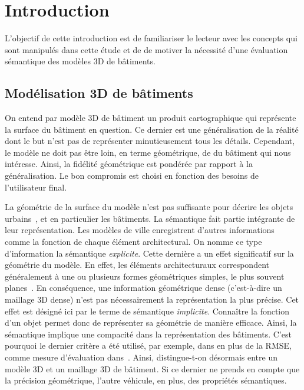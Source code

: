 \minitoc

\vfill

\section*{Introduction}

    L'objectif de cette introduction est de familiariser le lecteur avec les concepts qui sont manipulés dans cette étude et de de motiver la nécessité d'une évaluation sémantique des modèles 3D de bâtiments.\\

    \subsection*{Modélisation 3D de bâtiments}
        On entend par modèle 3D de bâtiment un produit cartographique qui représente la surface du bâtiment en question.
        Ce dernier est une généralisation de la réalité dont le but n'est pas de représenter minutieusement tous les détails.
        Cependant, le modèle ne doit pas être loin, en terme géométrique, de du bâtiment qui nous intéresse.
        Ainsi, la fidélité géométrique est pondérée par rapport à la généralisation.
        Le bon compromis est choisi en fonction des besoins de l'utilisateur final.

        La géométrie de la surface du modèle n'est pas suffisante pour décrire les objets urbains~\parencite{biljecki2016improved}, et en particulier les bâtiments.
        La sémantique fait partie intégrante de leur représentation.
        Les modèles de ville enregistrent d'autres informations comme la fonction de chaque élément architectural.
        On nomme ce type d'information la sémantique \textit{explicite}.
        Cette dernière a un effet significatif sur la géométrie du modèle.
        En effet, les éléments architecturaux correspondent généralement à une ou plusieurs formes géométriques simples, le plus souvent planes~\parencite{kolbe2005citygml}.
        En conséquence, une information géométrique dense (c'est-à-dire un maillage 3D dense) n'est pas nécessairement la représentation la plus précise.
        Cet effet est désigné ici par le terme de sémantique \textit{implicite}.
        Connaître la fonction d'un objet permet donc de représenter sa géométrie de manière efficace.
        Ainsi, la sémantique implique une compacité dans la représentation des bâtiments.
        C'est pourquoi le dernier critère a été utilisé, par exemple, dans en plus de la RMSE, comme mesure d'évaluation dans~\parencite{lafarge2012creating}.
        Ainsi, distingue-t-on désormais entre un modèle 3D et un maillage 3D de bâtiment.
        Si ce dernier ne prends en compte que la précision géométrique, l'autre véhicule, en plus, des propriétés sémantiques.

